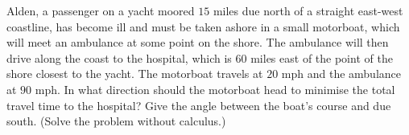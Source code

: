 Alden, a passenger on a yacht moored $15$ miles due north of a straight east-west coastline, has become ill and must be taken ashore in a small motorboat, which will meet an ambulance at some point on the shore. The ambulance will then drive along the coast to the hospital, which is $60$ miles east of the point of the shore closest to the yacht. The motorboat travels at $20$ mph and the ambulance at $90$ mph. In what direction should the motorboat head to minimise the total travel time to the hospital? Give the angle between the boat's course and due south. (Solve the problem without calculus.)
